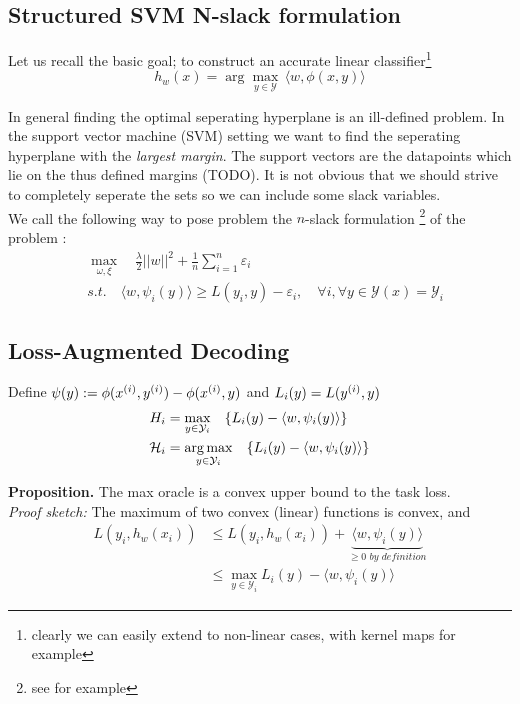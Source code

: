 \subsection{Structured SVM N-slack formulation}
Let us recall the basic goal; to construct an accurate linear
classifier\footnote{clearly we can easily extend to non-linear cases, with kernel maps for example}
\begin{equation}
  h_{w}(x)= \arg\max_{y\in \mathcal Y} \, \langle w, \phi(x,y)\rangle
\end{equation}

In general finding the optimal seperating hyperplane is an ill-defined problem.
In the support vector machine (SVM) setting we want to find the seperating
hyperplane with the \emph{largest margin}. The support vectors are the
datapoints which lie on the thus defined margins (TODO). It is not obvious
that we should strive to completely seperate the sets so we can include some
slack variables.\\

We call the following way to pose problem the $n$-slack formulation
\footnote{see \citet{moguerzaSupportVectorMachines2006} for example} of the problem :
\begin{align}
    &\max_{\omega, \xi}\quad\frac{\lambda}{2}||w||^{2}+ \frac{1}{n}\sum_{i=1}^{n}\varepsilon_{i}\\
    &\textit{s.t.}\quad \langle w, \psi_{i}(y)\rangle \geq L(y_{i},y)-
\varepsilon_{i},\quad\forall i ,\forall y \in\mathcal{Y}(x)=\mathcal{Y}_{i}
\end{align}

\subsection{Loss-Augmented Decoding}
Define $\psi(y) := \phi(x^{(i)},y^{(i)}) - \phi(x^{(i)},y)$ and $L_i(y) = L(y^{(i)}, y)$
\begin{align}
H_i &= \max_{y\in\mathcal{Y}_{i}} \quad \{L_{i}(y)- \langle w, \psi_{i}(y)\rangle\} \\
\mathcal H_i &= \operatorname*{\arg\max}_{y\in\mathcal{Y}_{i}} \quad \{ L_{i}(y)- \langle w, \psi_{i}(y)\rangle \}
\end{align}

\textbf{Proposition.} The max oracle is a convex upper bound to the task loss.\\
\textit{Proof sketch:} The maximum of two convex (linear) functions is convex, and
\begin{equation*}
\begin{align} L(y_{i},h_{w}(x_{i})) &\leq L(y_{i},h_{w}(x_{i})) +
        \underbrace{\langle w, \psi_{i}(y)\rangle}_{\geq 0 \textit{ by definition}} \\
    \quad\quad &\leq \max_{y\in\mathcal{Y}_{i}} L_{i}(y)- \langle w, \psi_{i}(y)\rangle
\end{align}
\end{equation*}


